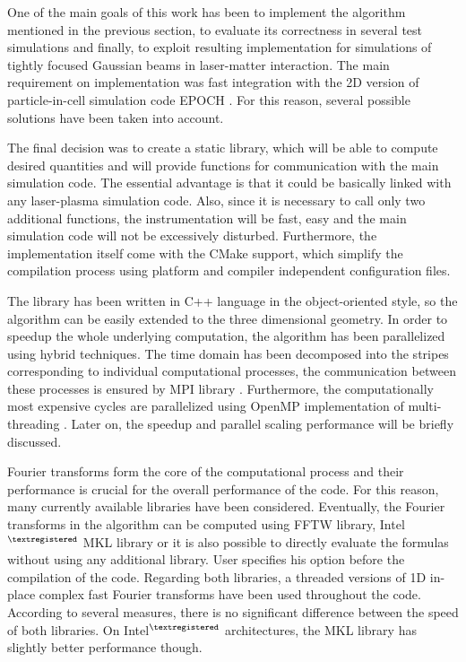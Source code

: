 One of the main goals of this work has been to implement the algorithm mentioned in the previous section, to evaluate its correctness in several test simulations and finally, to exploit resulting implementation for simulations of tightly focused Gaussian beams in laser-matter interaction. The main requirement on implementation was fast integration with the 2D version of particle-in-cell simulation code EPOCH \cite{bennett}. For this reason, several possible solutions have been taken into account.

The final decision was to create a static library, which will be able to compute desired quantities and will provide functions for communication with the main simulation code. The essential advantage is that it could be basically linked with any laser-plasma simulation code. Also, since it is necessary to call only two additional functions, the instrumentation will be fast, easy and the main simulation code will not be excessively disturbed. Furthermore, the implementation itself come with the CMake \cite{Cmake2012} support, which simplify the compilation process using platform and compiler independent configuration files.

The library has been written in C++ language in the object-oriented style, so the algorithm can be easily extended to the three dimensional geometry. In order to speedup the whole underlying computation, the algorithm has been parallelized using hybrid techniques. The time domain has been decomposed into the stripes corresponding to individual computational processes, the communication between these processes is ensured by MPI library \cite{MPI1994}. Furthermore, the computationally most expensive cycles are parallelized using OpenMP implementation of multi-threading \cite{OpenMP1998}. Later on, the speedup and parallel scaling performance will be briefly discussed.

Fourier transforms form the core of the computational process and their performance is crucial for the overall performance of the code. For this reason, many currently available libraries have been considered. Eventually, the Fourier transforms in the algorithm can be computed using FFTW \cite{Frigo1998} library, Intel$ ^{\scriptsize \textregistered} $ MKL \cite{MKL2009} library or it is also possible to directly evaluate the formulas without using any additional library. User specifies his option before the compilation of the code. Regarding both libraries, a threaded versions of 1D in-place complex fast Fourier transforms have been used throughout the code. According to several measures, there is no significant difference between the speed of both libraries. On Intel$ ^{\scriptsize \textregistered} $ architectures, the MKL library \cite{MKL2009} has slightly better performance though.

